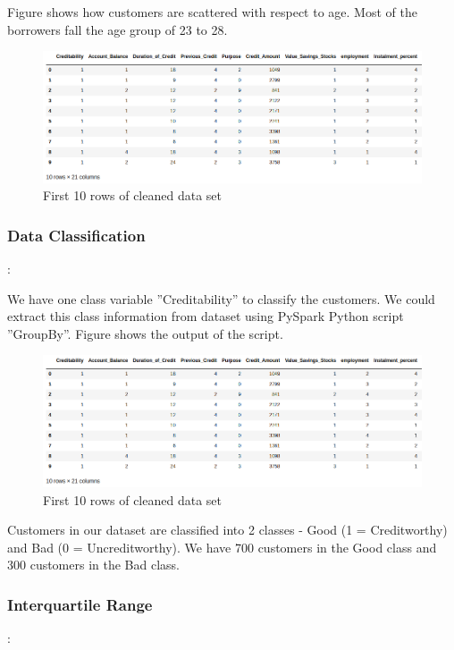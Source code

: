 \documentclass[sigconf]{acmart}
\begin{document}
Figure shows how customers are scattered with respect to age. Most of the borrowers fall the age group of 23 to 28.

\begin{figure}[htb]
  \centering
  \includegraphics[width=1.0\columnwidth]{project/images/Figure3.png}
  \caption{First 10 rows of cleaned data set
  \cite{psu-site}}
  \label{fig:Figure3} 
\end{figure}

\subsubsection{Data Classification}:

We have one class variable ''Creditability'' to classify the customers. We could extract this class information from dataset using PySpark Python script ''GroupBy''. Figure shows the output of the script.

\begin{figure}[htb]
  \centering
  \includegraphics[width=1.0\columnwidth]{project/images/Figure3.png}
  \caption{First 10 rows of cleaned data set
  \cite{psu-site}}
  \label{fig:Figure3} 
\end{figure}

Customers in our dataset are classified into 2 classes - Good (1 = Creditworthy) and Bad (0 = Uncreditworthy). We have 700 customers in the Good class and 300 customers in the Bad class.


\subsubsection{Interquartile Range}:
\end{document}

